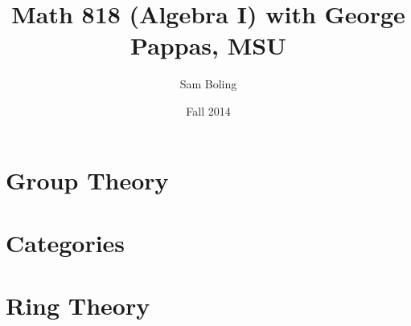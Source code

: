 \documentclass{report}
\title{Math 818 (Algebra I) with George Pappas, MSU}
\author{Sam Boling}
\date{Fall 2014}
\begin{document}
\maketitle

\chapter{Group Theory}








\chapter{Categories}


\chapter{Ring Theory}

\end{document}
